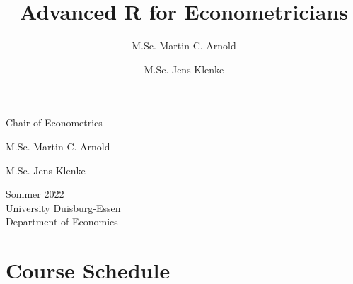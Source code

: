 \documentclass[]{article}
\author{\Large M.Sc. Martin C.
Arnold\vspace{0.05in} \newline\normalsize\emph{}   \and \Large M.Sc.
Jens Klenke\vspace{0.05in} \newline\normalsize\emph{}  }
\title{\center Advanced R for Econometricians \\[1em]\smaller{Semester
overview}  }
\date{}
\begin{document}
	
%    


{%

{

\vskip 40pt\relax \normalsize\fontsize{11}{12}

\begin{minipage}[t]{.49\textwidth}
Chair of Econometrics

M.Sc. Martin C. Arnold \hskip 15pt \emph{\small }   \par M.Sc. Jens
Klenke \hskip 15pt \emph{\small }   
\end{minipage}%
%
\hfill
%
\begin{minipage}[t]{.49\textwidth}
  \begin{flushright}
    Sommer 2022\\
    University Duisburg-Essen\\
    Department of Economics\\
  \end{flushright}
\end{minipage}

\vspace{20pt}

}

\setlength{\parindent}{0pt}
\thispagestyle{plain}
{\fontsize{10}{10}\selectfont\raggedright 
{\let\newpage\relax\maketitle}

}


}

\vskip 8.5pt





\vskip 6.5pt


\noindent  \hypertarget{course-schedule}{%
\section{Course Schedule}\label{course-schedule}}
\end{document}
